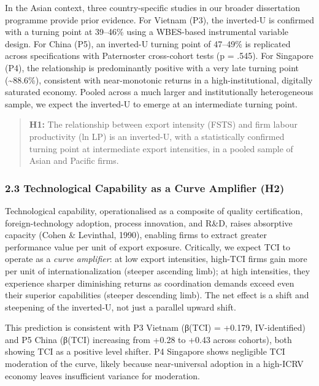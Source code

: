 \documentclass[
  12pt,a4paper]{article}
\begin{document}
In the Asian context, three country-specific studies in our broader
dissertation programme provide prior evidence. For Vietnam (P3), the
inverted-U is confirmed with a turning point at 39--46\% using a
WBES-based instrumental variable design. For China (P5), an inverted-U
turning point of 47--49\% is replicated across specifications with
Paternoster cross-cohort tests (p = .545). For Singapore (P4), the
relationship is predominantly positive with a very late turning point
(\textasciitilde88.6\%), consistent with near-monotonic returns in a
high-institutional, digitally saturated economy. Pooled across a much
larger and institutionally heterogeneous sample, we expect the
inverted-U to emerge at an intermediate turning point.

\begin{quote}
\textbf{H1:} The relationship between export intensity (FSTS) and firm
labour productivity (ln LP) is an inverted-U, with a statistically
confirmed turning point at intermediate export intensities, in a pooled
sample of Asian and Pacific firms.
\end{quote}

\hypertarget{technological-capability-as-a-curve-amplifier-h2}{%
\subsubsection{2.3 Technological Capability as a Curve Amplifier
(H2)}\label{technological-capability-as-a-curve-amplifier-h2}}

Technological capability, operationalised as a composite of quality
certification, foreign-technology adoption, process innovation, and
R\&D, raises absorptive capacity (Cohen \& Levinthal, 1990), enabling
firms to extract greater performance value per unit of export exposure.
Critically, we expect TCI to operate as a \emph{curve amplifier}: at low
export intensities, high-TCI firms gain more per unit of
internationalization (steeper ascending limb); at high intensities, they
experience sharper diminishing returns as coordination demands exceed
even their superior capabilities (steeper descending limb). The net
effect is a shift and steepening of the inverted-U, not just a parallel
upward shift.

This prediction is consistent with P3 Vietnam (β(TCI) = +0.179,
IV-identified) and P5 China (β(TCI) increasing from +0.28 to +0.43
across cohorts), both showing TCI as a positive level shifter. P4
Singapore shows negligible TCI moderation of the curve, likely because
near-universal adoption in a high-ICRV economy leaves insufficient
variance for moderation.
\end{document}
